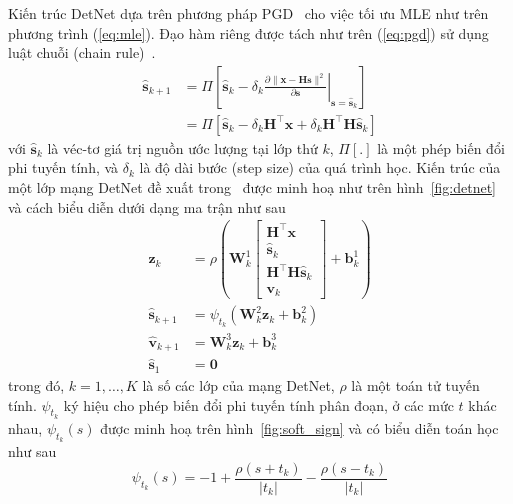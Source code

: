Kiến trúc DetNet dựa trên phương pháp PGD~\cite{Chen2015} cho việc tối ưu MLE như trên phương trình (\ref{eq:mle}). Đạo hàm riêng được tách như trên (\ref{eq:pgd}) sử dụng luật chuỗi (chain rule)~\cite{Minka2000}.
\begin{equation}
\label{eq:pgd}
    \begin{aligned}
    \hat{\mathbf{s}}_{k+1} & =\Pi\left[\hat{\mathbf{s}}_k-\left.\delta_k \frac{\partial\|\mathbf{x}-\mathbf{H} \mathbf{s}\|^2}{\partial \mathbf{s}}\right|_{\mathbf{s}=\hat{\mathbf{s}}_k}\right] \\
    & =\Pi\left[\hat{\mathbf{s}}_k-\delta_k \mathbf{H}^\top \mathbf{x}+\delta_k \mathbf{H}^\top \mathbf{H} \hat{\mathbf{s}}_k\right]
    \end{aligned}
\end{equation}
với $\hat{\mathbf{s}}_k$ là véc-tơ giá trị nguồn ước lượng tại lớp thứ $k$, $\Pi [.]$ là một phép biến đổi phi tuyến tính, và $\delta_k$ là độ dài bước (step size) của quá trình học. Kiến trúc của một lớp mạng DetNet đề xuất trong~\cite{Samuel2017} được minh hoạ như trên hình~\ref{fig:detnet} và cách biểu diễn dưới dạng ma trận như sau
\allowdisplaybreaks
\begin{subequations}
\begin{alignat}{4}
    \mathbf{z}_k & =\rho\left(\mathbf{W}^1_{k}\left[\begin{array}{c}
    \mathbf{H}^\top \mathbf{x} \\
    \hat{\mathbf{s}}_k \\
    \mathbf{H}^\top \mathbf{H} \hat{\mathbf{s}}_k \\
    \mathbf{v}_k
    \end{array}\right]+\mathbf{b}^1_{k}\right) \\
    \hat{\mathbf{s}}_{k+1} & =\psi_{t_k}\left(\mathbf{W}^2_{k} \mathbf{z}_k+ \mathbf{b}^2_{k}\right) \\
    \hat{\mathbf{v}}_{k+1} & =\mathbf{W}^3_{k} \mathbf{z}_k+ 
    \mathbf{b}^3_{k} \\
    \hat{\mathbf{s}}_1 & =\mathbf{0}
\end{alignat}
\end{subequations}
trong đó, $k = 1, \ldots, K$ là số các lớp của mạng DetNet, $\rho$ là một toán tử tuyến tính. $\psi_{t_k}$ ký hiệu cho phép biến đổi phi tuyến tính phân đoạn, ở các mức $t$ khác nhau, $\psi_{t_k}(s)$ được minh hoạ trên hình~\ref{fig:soft_sign} và có biểu diễn toán học như sau
\begin{equation}
    \psi_{t_k}(s)=-1+\frac{\rho\left(s + t_k \right)}{\left|t_k\right|}-\frac{\rho\left(s- t_k \right)}{\left|t_k\right|}
\end{equation}

